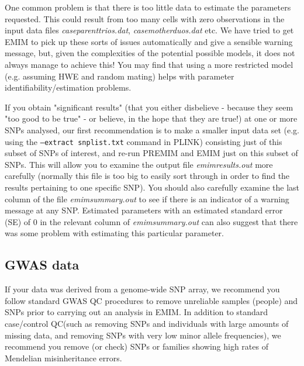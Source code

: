 \documentclass[a4paper,12pt]{article}
\newcommand{\code}[1]{{\footnotesize{{\tt #1}}}}
\begin{document}
One common problem is that there is too little data to estimate the parameters requested. This could result from too many cells with zero observations in the input data files {\it caseparenttrios.dat}, {\it casemotherduos.dat} etc. We have tried to get EMIM to pick up these sorts of issues automatically and give a sensible warning message, but, given the complexities of the potential possible models, it does not always manage to achieve this! You may find that using a more restricted model (e.g. assuming HWE and random mating) helps with parameter identifiability/estimation problems. 

If you obtain "significant results" (that you either disbelieve - because they seem "too good to be true" - or believe, in the hope that they are true!) at one or more SNPs analysed, our first recommendation is to make a smaller input data set (e.g. using the \code{--extract snplist.txt} command in PLINK) consisting just of this subset of SNPs of interest, and re-run PREMIM and EMIM just on this subset of SNPs. This will allow you to examine the output file {\it emimresults.out} more carefully (normally this file is too big to easily sort through in order to find the results pertaining to one specific SNP). You should also carefully examine the last column of the file {\it emimsummary.out} to see if there is an indicator of a warning message at any SNP. Estimated parameters with an estimated standard error (SE) of 0 in the relevant column of {\it emimsummary.out} can also suggest that there was some problem with estimating this particular parameter. 
\subsection{GWAS data}
\label{GWAS}

If your data was derived from a genome-wide SNP array, we recommend you follow standard GWAS QC procedures to remove unreliable samples (people) and SNPs prior to carrying out an analysis in EMIM. In addition to standard case/control QC(such as removing SNPs and individuals with large amounts of missing data, and removing SNPs with very low minor allele frequencies), we recommend you remove (or check) SNPs or families showing high rates of Mendelian misinheritance errors. 
\end{document}
